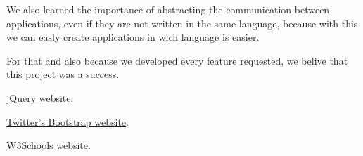 \documentclass[a4paper]{article}
\begin{document}
We also learned the importance of abstracting the communication between applications, even if they are not written in the same language, because with this we can easly create applications in wich language is easier.

For that and also because we developed every feature requested, we belive that this project was a success.
\clearpage

\begin{thebibliography}{9}
	\href{http://jquery.com/}{jQuery website}.

	\href{http://getbootstrap.com/}{Twitter's Bootstrap website}.

	\href{http://www.w3schools.com/}{W3Schools website}.

\end{thebibliography}
\end{document}
